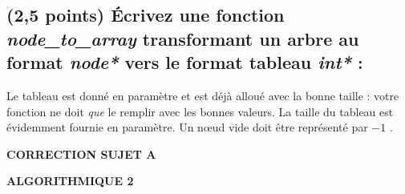 \documentclass[11pt,a4paper]{article}
\newcommand{\TitreMatiere}{Algorithmique 2}
\begin{document}
\clearpage


\subsection{(2,5 points) \'Ecrivez une fonction \og \textit{node\_to\_array} \fg{} transformant un arbre au format \textit{node*} vers le format tableau \textit{int*} : }

\noindent Le tableau est donné en paramètre et est déjà alloué avec la bonne taille : votre fonction ne doit \textit{que} le remplir avec les bonnes valeurs.
La taille du tableau est évidemment fournie en paramètre.
Un nœud vide doit être représenté par \og $-1$ \fg.

\begin{center}
\end{center}




\clearpage




\vfillFirst

\begin{center}

\begin{LARGE}
\textbf{CORRECTION SUJET A}

\bigskip

\textbf{\MakeUppercase{\TitreMatiere}}
\end{LARGE}

\end{center}

\vfillLast
\end{document}
